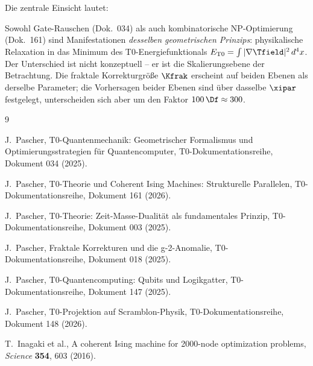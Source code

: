 Die zentrale Einsicht lautet:

\begin{revolutionary}
    Sowohl Gate-Rauschen (Dok.\ 034) als auch kombinatorische NP-Optimierung
    (Dok.\ 161) sind Manifestationen \emph{desselben geometrischen Prinzips}:
    physikalische Relaxation in das Minimum des T0-Energiefunktionals
    $E_{\text{T0}} = \int |\nabla \Tfield|^2 \, d^4x$.
    Der Unterschied ist nicht konzeptuell -- er ist die Skalierungsebene der
    Betrachtung. Die fraktale Korrekturgröße $\Kfrak$ erscheint auf beiden Ebenen
    als derselbe Parameter; die Vorhersagen beider Ebenen sind über dasselbe $\xipar$ festgelegt, unterscheiden sich aber um den Faktor $100\,\Df \approx 300$.
\end{revolutionary}

\begin{thebibliography}{9}

J.~Pascher,
\newblock T0-Quantenmechanik: Geometrischer Formalismus und Optimierungsstrategien
für Quantencomputer,
\newblock T0-Dokumentationsreihe, Dokument 034 (2025).

J.~Pascher,
\newblock T0-Theorie und Coherent Ising Machines: Strukturelle Parallelen,
\newblock T0-Dokumentationsreihe, Dokument 161 (2026).

J.~Pascher,
\newblock T0-Theorie: Zeit-Masse-Dualität als fundamentales Prinzip,
\newblock T0-Dokumentationsreihe, Dokument 003 (2025).

J.~Pascher,
\newblock Fraktale Korrekturen und die g-2-Anomalie,
\newblock T0-Dokumentationsreihe, Dokument 018 (2025).

J.~Pascher,
\newblock T0-Quantencomputing: Qubits und Logikgatter,
\newblock T0-Dokumentationsreihe, Dokument 147 (2025).

J.~Pascher,
\newblock T0-Projektion auf Scramblon-Physik,
\newblock T0-Dokumentationsreihe, Dokument 148 (2026).

T.~Inagaki et al.,
\newblock A coherent Ising machine for 2000-node optimization problems,
\newblock \emph{Science} \textbf{354}, 603 (2016).

\end{thebibliography}
